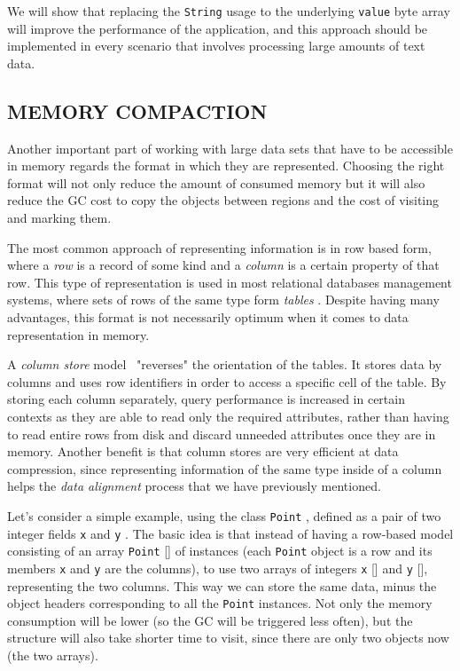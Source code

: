 \documentclass[a4paper,twoside]{article}
\begin{document}
We will show that replacing the \texttt{String} usage to the underlying \texttt{value} byte array will improve the performance of the application, and this approach should be implemented in every scenario that involves processing large amounts of text data.



\subsection{\uppercase{Memory Compaction}}\label{subsec:uppercase}
Another important part of working with large data sets that have to be accessible in memory regards the format in which they are represented.
Choosing the right format will not only reduce the amount of consumed memory but it will also reduce the GC cost to copy the objects between regions and the cost of visiting and marking them.

The most common approach of representing information is in row based form, where a {\textit{row} } is a record of some kind and a {\textit{column} } is a certain property of that row.
This type of representation is used in most relational databases management systems, where sets of rows of the same type form {\textit{tables} }.
Despite having many advantages, this format is not necessarily optimum when it comes to data representation in memory.

A {\textit{column store} } model~\cite{abadi:2013} "reverses" the orientation of the tables.
It stores data by columns and uses row identifiers in order to access a specific cell of the table.
By storing each column separately, query performance is increased in certain contexts as they are able to read only the required attributes, rather than having to read entire rows from disk and discard unneeded attributes once they are in memory.
Another benefit is that column stores are very efficient at data compression, since representing information of the same type inside of a column helps the {\textit{data alignment} } process that we have previously mentioned.

Let's consider a simple example, using the class {\texttt{Point} }, defined as a pair of two integer fields {\texttt{x} } and {\texttt{y} }.
The basic idea is that instead of having a row-based model consisting of an array {\texttt{Point} []} of instances (each {\texttt{Point} } object is a row and its members {\texttt{x} } and {\texttt{y} } are the columns), to use two arrays of integers {\texttt{x} []} and {\texttt{y} []}, representing the two columns.
This way we can store the same data, minus the object headers corresponding to all the {\texttt{Point} } instances.
Not only the memory consumption will be lower (so the GC will be triggered less often), but the structure will also take shorter time to visit, since there are only two objects now (the two arrays).
\end{document}
